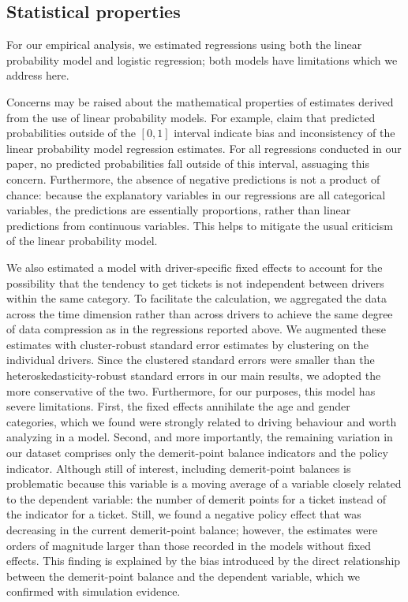 \documentclass{cje}
\begin{document}
\subsection{Statistical properties}

For our empirical analysis, we estimated regressions using
both the linear probability model
and logistic regression; both models have limitations
which we address here. 

Concerns may be raised about the mathematical properties of estimates 
derived from the use of linear probability models. 
For example, 
\citet{horraceoaxaca2006}
claim that predicted probabilities outside of the $[0,1]$ interval 
indicate bias and inconsistency of the linear probability model regression estimates. 
For all regressions conducted in our paper, 
no predicted probabilities fall outside of this interval, 
assuaging this concern. 
Furthermore, the absence of negative predictions is not a product of chance: 
because the explanatory variables in our regressions are all categorical variables, 
the predictions are essentially proportions, 
rather than linear predictions from continuous variables. 
This helps to mitigate the usual criticism of the linear probability model. 

We also estimated a model with driver-specific fixed effects
to account for the possibility that the tendency to get tickets
is not independent between drivers within the same category. 
To facilitate the calculation, we aggregated the data across the time dimension
rather than across drivers
to achieve the same degree of data compression as in the regressions reported above.
We augmented these estimates with cluster-robust standard error estimates 
by clustering on the individual drivers. 
Since the clustered standard errors were smaller than the heteroskedasticity-robust standard errors in our main results, 
we adopted the more conservative of the two.
Furthermore, for our purposes, this model has severe limitations. 
First, the fixed effects annihilate the age and gender categories, 
which we found were strongly related to driving behaviour
and worth analyzing in a model. 
Second, and more importantly, 
the remaining variation in our dataset comprises 
only the demerit-point balance indicators and the policy indicator. 
Although still of interest, including demerit-point balances is problematic because 
this variable is a moving average of a variable closely related to the dependent variable:
the number of demerit points for a ticket instead of the indicator for a ticket. 
Still, we found a negative policy effect that was decreasing 
in the current demerit-point balance;
however, the estimates were orders of magnitude larger 
than those recorded in the models without fixed effects. 
This finding is explained by the bias introduced by the direct relationship between the demerit-point balance and the dependent variable, 
which we confirmed with simulation evidence. 
\end{document}
